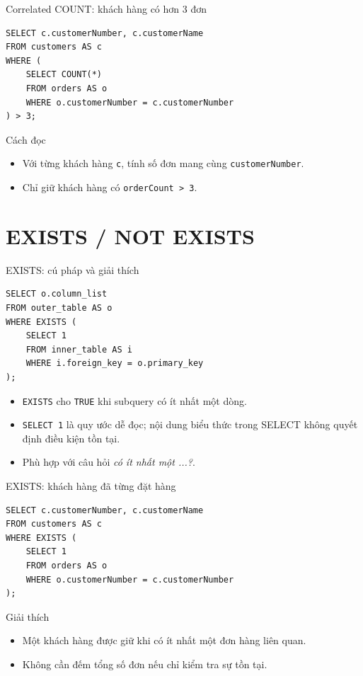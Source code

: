 \documentclass[aspectratio=169,10pt]{beamer}
\newcommand{\code}[1]{\texttt{#1}}
\begin{document}
\begin{frame}[fragile]{Correlated COUNT: khách hàng có hơn 3 đơn}
\begin{lstlisting}
SELECT c.customerNumber, c.customerName
FROM customers AS c
WHERE (
    SELECT COUNT(*)
    FROM orders AS o
    WHERE o.customerNumber = c.customerNumber
) > 3;
\end{lstlisting}
\begin{block}{Cách đọc}
\begin{itemize}
\item Với từng khách hàng \code{c}, tính số đơn mang cùng \code{customerNumber}.
\item Chỉ giữ khách hàng có \code{orderCount > 3}.
\end{itemize}
\end{block}
\end{frame}

\section{EXISTS / NOT EXISTS}

\begin{frame}[fragile]{EXISTS: cú pháp và giải thích}
\begin{lstlisting}
SELECT o.column_list
FROM outer_table AS o
WHERE EXISTS (
    SELECT 1
    FROM inner_table AS i
    WHERE i.foreign_key = o.primary_key
);
\end{lstlisting}
\begin{itemize}
\item \code{EXISTS} cho \code{TRUE} khi subquery có ít nhất một dòng.
\item \code{SELECT 1} là quy ước dễ đọc; nội dung biểu thức trong SELECT không quyết định điều kiện tồn tại.
\item Phù hợp với câu hỏi \emph{có ít nhất một ...?}.
\end{itemize}
\end{frame}

\begin{frame}[fragile]{EXISTS: khách hàng đã từng đặt hàng}
\begin{lstlisting}
SELECT c.customerNumber, c.customerName
FROM customers AS c
WHERE EXISTS (
    SELECT 1
    FROM orders AS o
    WHERE o.customerNumber = c.customerNumber
);
\end{lstlisting}
\begin{block}{Giải thích}
\begin{itemize}
\item Một khách hàng được giữ khi có ít nhất một đơn hàng liên quan.
\item Không cần đếm tổng số đơn nếu chỉ kiểm tra sự tồn tại.
\end{itemize}
\end{block}
\end{frame}
\end{document}

